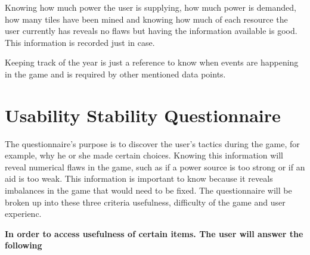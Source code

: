 \documentclass[msc,oneside]{ubcthesis}%
\begin{document}
  Knowing how much power the user is supplying, how much power is demanded, how many tiles have been mined and knowing how much of each resource the user currently has reveals no flaws but having the information available is good. This information is recorded just in case. 

  Keeping track of the year is just a reference to know when events are happening in the game and is required by other mentioned data points. 

  \section{Usability Stability Questionnaire}

    The questionnaire's purpose is to discover the user's tactics during the game, for example, why he or she made certain choices. Knowing this information will reveal numerical flaws in the game, such as if a power source is too strong or if an aid is too weak. This information is important to know because it reveals imbalances in the game that would need to be fixed. 
    The questionnaire will be broken up into these three criteria usefulness, difficulty of the game and user experienc.
    
    \textbf{In order to access usefulness of certain items. The user will answer the following}
\end{document}
